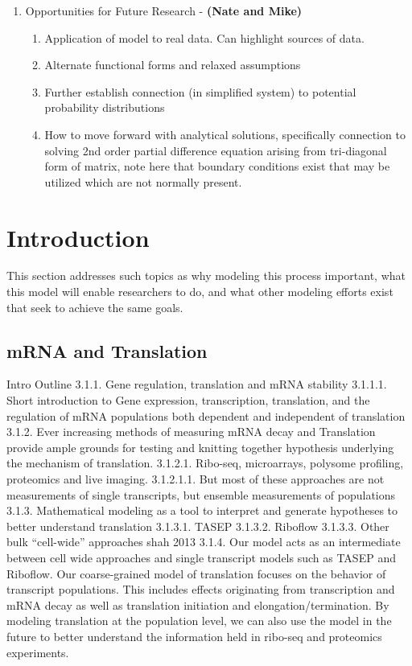 \documentclass[review]{elsarticle}
\begin{document}
\begin{enumerate}
\begin{enumerate}
\end{enumerate}
\item Opportunities for Future Research  - \textbf{(Nate and Mike)}
\begin{enumerate}
\item Application of model to real data.
Can highlight sources of data.
\item Alternate functional forms and relaxed assumptions
\item Further establish connection (in simplified system) to potential probability distributions
\item How to move forward with analytical solutions, specifically connection to solving 2nd order partial difference equation arising from tri-diagonal form of matrix, note here that boundary conditions exist that may be utilized which are not normally present.
\end{enumerate}
\end{enumerate}
\newpage
\section{Introduction}
This section addresses such topics as why modeling this process important, what this model will enable researchers to do, and what other modeling efforts exist that seek to achieve the same goals.

\subsection{mRNA and Translation}\label{sec:Bioligical underpinnings}

Intro Outline
3.1.1.	 Gene regulation, translation and mRNA stability
3.1.1.1.	Short introduction to Gene expression, transcription, translation, and the regulation of mRNA populations both dependent and independent of translation
3.1.2.	 Ever increasing methods of measuring mRNA decay and Translation provide ample grounds for testing and knitting together hypothesis underlying the mechanism of translation.
3.1.2.1.	Ribo-seq, microarrays, polysome profiling, proteomics and live imaging. 
3.1.2.1.1.	But most of these approaches are not measurements of single transcripts, but ensemble measurements of populations
3.1.3.	 Mathematical modeling as a tool to interpret and generate hypotheses to better understand translation
3.1.3.1.	TASEP
3.1.3.2.	Riboflow
3.1.3.3.	Other bulk “cell-wide” approaches shah 2013
3.1.4.	 Our model acts as an intermediate between cell wide approaches and single transcript models such as TASEP and Riboflow. Our coarse-grained model of translation focuses on the behavior of transcript populations. This includes effects originating from transcription and mRNA decay as well as translation initiation and elongation/termination. By modeling translation at the population level, we can also use the model in the future to better understand the information held in ribo-seq and proteomics experiments. 
\end{document}
